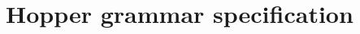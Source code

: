 \chapter{Hopper grammar specification} \label{app:grammar}

\lstset{basicstyle=\ttfamily\scriptsize}


